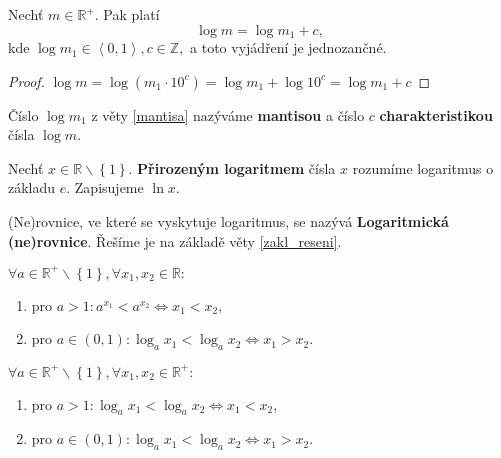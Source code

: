 \begin{veta}\label{mantisa}
    Nechť $m\in \mathbb R^+.$ Pak platí
    $$\log m = \log m_1 + c,$$
    kde $\log m_1 \in \left < 0,1 \right >, c \in \mathbb Z,$ a toto vyjádření
    je jednozančné.
\end{veta}

\begin{proof}
    $\log m = \log \left ( m_1\cdot 10^c \right ) = \log m_1 + \log 10^c
    = \log m_1 + c$
\end{proof}

\begin{definition}
    Číslo $\log m_1$ z věty \ref{mantisa} nazýváme \textbf{mantisou} a číslo
    $c$ \textbf{charakteristikou} čísla $\log m.$
\end{definition}

\begin{definition}
    Nechť $x \in \mathbb R\smallsetminus\left \{ 1 \right \}. $ \textbf{Přirozeným logaritmem} čísla $x$
    rozumíme logaritmus o základu $e$. Zapisujeme $\ln x.$
\end{definition}

\begin{definition}
    (Ne)rovnice, ve které se vyskytuje logaritmus, se nazývá \textbf{Logaritmická (ne)rovnice}.
    Řešíme je na základě věty \ref{zakl_reseni}.
\end{definition}

\begin{veta}
    $\forall a \in \mathbb R^+ \smallsetminus \left \{ 1 \right \} , \forall x_1, x_2
    \in \mathbb R:$
    \begin{enumerate}[$i.$]
        \item pro $a>1:a^{x_1}<a^{x_2}\iff x_1 < x_2,$
       	\item pro $a \in (0,1): \log_a x_1 < \log_a x_2 \iff x_1 > x_2.$
    \end{enumerate}
\end{veta}

\begin{veta}
    $\forall a \in \mathbb R^+ \smallsetminus \left \{ 1 \right \} , \forall x_1, x_2
    \in \mathbb R^+:$
    \begin{enumerate}[$i.$]
        \item pro $a>1:\log_a x_1 < \log_a x_2 \iff x_1 < x_2$,
       	\item pro $a\in (0,1): \log_a x_1 < \log_a x_2 \iff x_1 > x_2.$
    \end{enumerate}
\end{veta}

